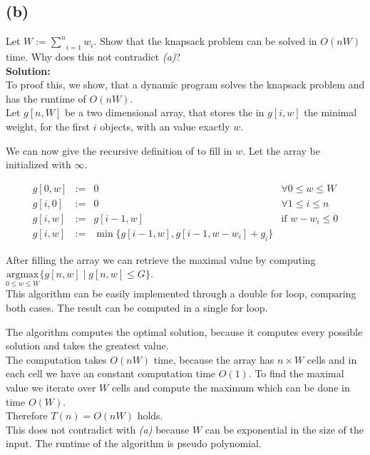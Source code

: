 \subsection*{(b)}

Let $W := \underset{i=1}{\overset{n}{\sum}} w_i$. Show that the knapsack problem can be solved in $O(nW)$ time. Why does this not
contradict \emph{(a)}?\\

\textbf{Solution:}\\

To proof this, we show, that a dynamic program solves the knapsack problem and has the runtime of $O(nW)$.\\
Let $g[n,W]$ be a two dimensional array, that stores the in $g[i,w]$ the minimal weight, for the first $i$ objects,
with an value exactly $w$.

We can now give the recursive definition of to fill in $w$. Let the array be initialized with $\infty$.

$$\begin{array}{lclr}
    g[0,w]  &:=& 0          & \forall 0 \leq w \leq W\\
    g[i,0]  &:=& 0          & \forall 1 \leq i \leq n\\
    g[i,w]  &:=& g[i-1,w]   & \text{if } w - w_i \leq 0\\
    g[i,w]  &:=& \min \{ g[i-1,w] , g[i-1 , w - w_i] + g_i\}
\end{array}$$

After filling the array we can retrieve the maximal value by computing\\
$\underset{0 \leq w \leq W}{\text{argmax}} \{ g[n,w] \; | \; g[n,w] \leq G \}$.\\

This algorithm can be easily implemented through a double for loop, comparing
both cases. The result can be computed in a single for loop.

The algorithm computes the optimal solution, because it computes every possible solution and takes the greatest value.\\
The computation takes $O(nW)$ time, because the array has $n \times W$ cells and in each cell we have an constant
computation time $O(1)$.
To find the maximal value we iterate over $W$ cells and compute the maximum which can be done in time $O(W)$.\\
Therefore $T(n) = O(nW)$ holds.\\

This does not contradict with \emph{(a)} because $W$ can be exponential in the size of the input. The runtime of the algorithm
is pseudo polynomial.

